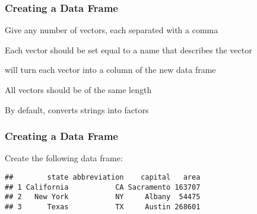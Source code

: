 \documentclass[12pt]{beamer}\usepackage[]{graphicx}\usepackage[]{color}
\makeatletter
\newenvironment{kframe}{%
 \def\at@end@of@kframe{}%
 \ifinner\ifhmode%
  \def\at@end@of@kframe{\end{minipage}}%
  \begin{minipage}{\columnwidth}%
 \fi\fi%
 \def\FrameCommand##1{\hskip\@totalleftmargin \hskip-\fboxsep
 \colorbox{shadecolor}{##1}\hskip-\fboxsep
     \hskip-\linewidth \hskip-\@totalleftmargin \hskip\columnwidth}%
 \MakeFramed {\advance\hsize-\width
   \@totalleftmargin\z@ \linewidth\hsize
   \@setminipage}}%
 {\par\unskip\endMakeFramed%
 \at@end@of@kframe}
\newenvironment{knitrout}{}{} %
\makeatother
\begin{document}

\begin{frame}
\frametitle{Creating a Data Frame}

\bi 
  \item Give  any number of vectors, each separated with a comma
  \item Each vector should be set equal to a name that describes the vector
  \item {} will turn each vector into a column of the new data frame
  \item All vectors should be of the same length
  \item By default,  converts strings into factors
\ei
\end{frame}


\begin{frame}[fragile]
\frametitle{Creating a Data Frame}

Create the following data frame:
\begin{knitrout}\footnotesize
{}\color{fgcolor}\begin{kframe}
\begin{verbatim}
##        state abbreviation    capital   area
## 1 California           CA Sacramento 163707
## 2   New York           NY     Albany  54475
## 3      Texas           TX     Austin 268601
\end{verbatim}
\end{kframe}
\end{knitrout}

\end{frame}

\end{document}
